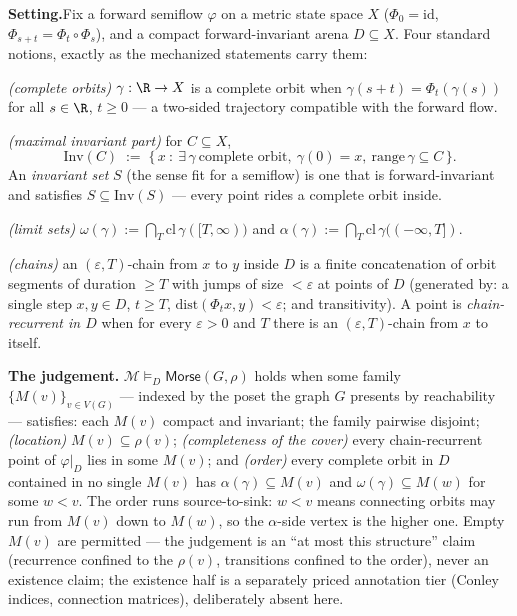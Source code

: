 

\textbf{Setting.}\enspace Fix a forward semiflow $\varphi$ on a metric
state space $X$ ($\Phi_0 = \mathrm{id}$,
$\Phi_{s+t} = \Phi_t \circ \Phi_s$), and a compact forward-invariant
arena $D \subseteq X$. Four standard notions, exactly as the mechanized
statements carry them:

\emph{(complete orbits)} $\gamma : \R \to X$ is a complete orbit when
$\gamma(s + t) = \Phi_t(\gamma(s))$ for all $s \in \R$, $t \geq 0$ ---
a two-sided trajectory compatible with the forward flow.

\emph{(maximal invariant part)} for $C \subseteq X$,
\[
\mathrm{Inv}(C) \;:=\; \{\, x \ :\ \exists\, \gamma \ \text{complete
orbit},\ \gamma(0) = x,\ \mathrm{range}\,\gamma \subseteq C \,\}.
\]
An \emph{invariant set} $S$ (the sense fit for a semiflow) is one that
is forward-invariant and satisfies $S \subseteq \mathrm{Inv}(S)$ ---
every point rides a complete orbit inside.

\emph{(limit sets)} $\omega(\gamma) := \bigcap_{T}
\mathrm{cl}\,\gamma([T, \infty))$ and $\alpha(\gamma) := \bigcap_{T}
\mathrm{cl}\,\gamma((-\infty, T])$.

\emph{(chains)} an $(\varepsilon, T)$-chain from $x$ to $y$ inside $D$
is a finite concatenation of orbit segments of duration $\geq T$ with
jumps of size $< \varepsilon$ at points of $D$ (generated by: a single
step $x, y \in D$, $t \geq T$,
$\mathrm{dist}(\Phi_t x, y) < \varepsilon$; and transitivity). A point
is \emph{chain-recurrent in $D$} when for every $\varepsilon > 0$ and
$T$ there is an $(\varepsilon, T)$-chain from $x$ to itself.

\textbf{The judgement.}\enspace
$\mathcal{M} \vDash_D \mathsf{Morse}(G, \rho)$ holds when some family
$\{M(v)\}_{v \in V(G)}$ --- indexed by the poset the graph $G$
presents by reachability --- satisfies:
each $M(v)$ compact and invariant; the family pairwise disjoint;
\emph{(location)} $M(v) \subseteq \rho(v)$;
\emph{(completeness of the cover)} every chain-recurrent point of
$\varphi|_D$ lies in some $M(v)$; and
\emph{(order)} every complete orbit in $D$ contained in no single
$M(v)$ has $\alpha(\gamma) \subseteq M(v)$ and
$\omega(\gamma) \subseteq M(w)$ for some $w < v$. The order runs
source-to-sink: $w < v$ means connecting orbits may run from $M(v)$
down to $M(w)$, so the $\alpha$-side vertex is the higher one. Empty
$M(v)$ are permitted --- the judgement is an ``at most this structure''
claim (recurrence confined to the $\rho(v)$, transitions confined to
the order), never an existence claim; the existence half is a
separately priced annotation tier (Conley indices, connection
matrices), deliberately absent here.

